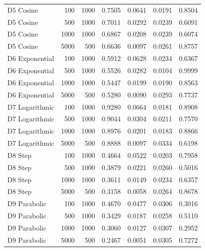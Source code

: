 \begin{tabular}{lrrrrrr}
      D5 Cosine &   100 &  1000 &   0.7505 &  0.0641 &   0.0191 &   0.8504 \\
      D5 Cosine &   500 &  1000 &   0.7011 &  0.0292 &   0.0239 &   0.6091 \\
      D5 Cosine &  1000 &  1000 &   0.6867 &  0.0208 &   0.0239 &   0.6074 \\
      D5 Cosine &  5000 &   500 &   0.6636 &  0.0097 &   0.0261 &   0.8757 \\
 D6 Exponential &   100 &  1000 &   0.5912 &  0.0628 &   0.0234 &   0.6367 \\
 D6 Exponential &   500 &  1000 &   0.5526 &  0.0282 &   0.0104 &   0.9999 \\
 D6 Exponential &  1000 &  1000 &   0.5447 &  0.0199 &   0.0190 &   0.8563 \\
 D6 Exponential &  5000 &   500 &   0.5280 &  0.0090 &   0.0293 &   0.7737 \\
 D7 Logarithmic &   100 &  1000 &   0.9280 &  0.0664 &   0.0181 &   0.8908 \\
 D7 Logarithmic &   500 &  1000 &   0.9044 &  0.0304 &   0.0211 &   0.7570 \\
 D7 Logarithmic &  1000 &  1000 &   0.8976 &  0.0201 &   0.0183 &   0.8866 \\
 D7 Logarithmic &  5000 &   500 &   0.8888 &  0.0097 &   0.0334 &   0.6198 \\
        D8 Step &   100 &  1000 &   0.4664 &  0.0522 &   0.0203 &   0.7958 \\
        D8 Step &   500 &  1000 &   0.3879 &  0.0221 &   0.0260 &   0.5016 \\
        D8 Step &  1000 &  1000 &   0.3611 &  0.0149 &   0.0234 &   0.6357 \\
        D8 Step &  5000 &   500 &   0.3158 &  0.0058 &   0.0264 &   0.8678 \\
   D9 Parabolic &   100 &  1000 &   0.4670 &  0.0477 &   0.0306 &   0.3016 \\
   D9 Parabolic &   500 &  1000 &   0.3429 &  0.0187 &   0.0258 &   0.5110 \\
   D9 Parabolic &  1000 &  1000 &   0.3060 &  0.0127 &   0.0307 &   0.2952 \\
   D9 Parabolic &  5000 &   500 &   0.2467 &  0.0051 &   0.0305 &   0.7272 \\
\bottomrule
\end{tabular}
